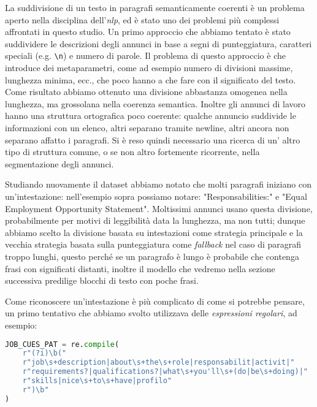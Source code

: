 \noindent La suddivisione di un testo in paragrafi semanticamente coerenti è un problema aperto nella disciplina dell'\textit{nlp}, ed è stato uno dei problemi più complessi affrontati in questo studio. Un primo approccio che abbiamo tentato è stato suddividere le descrizioni degli annunci in base a segni di punteggiatura, caratteri speciali (e.g. \texttt{\textbackslash n}) e numero di parole. Il problema di questo approccio è che introduce dei metaparametri, come ad esempio numero di divisioni massime, lunghezza minima, ecc., che poco hanno a che fare con il significato del testo. Come risultato abbiamo ottenuto una divisione abbastanza omogenea nella lunghezza, ma grossolana nella coerenza semantica. Inoltre gli annunci di lavoro hanno una struttura ortografica poco coerente: qualche annuncio suddivide le informazioni con un elenco, altri separano tramite newline, altri ancora non separano affatto i paragrafi. Si è reso quindi necessario una ricerca di un' altro tipo di struttura comune, o se non altro fortemente ricorrente, nella segmentazione degli annunci.

\medskip

\noindent Studiando nuovamente il dataset abbiamo notato che molti paragrafi iniziano con un'intestazione: nell'esempio sopra possiamo notare: "Responsabilities:" e "Equal Employment Opportunity Statement". Moltissimi annunci usano questa divisione, probabilmente  per motivi di leggibilità data la lunghezza, ma non tutti; dunque abbiamo scelto la divisione basata su intestazioni come strategia principale e la vecchia strategia basata sulla punteggiatura come \textit{fallback} nel caso di paragrafi troppo lunghi, questo perché se un paragrafo è lungo è probabile che contenga frasi con significati distanti, inoltre il modello che vedremo nella sezione successiva predilige blocchi di testo con poche frasi.

\medskip

\noindent Come riconoscere un'intestazione è più complicato di come si potrebbe pensare, un primo tentativo che abbiamo svolto utilizzava delle \textit{espressioni regolari}, ad esempio:

\begin{lstlisting}[language=python]
JOB_CUES_PAT = re.compile(
    r"(?i)\b("
    r"job\s+description|about\s+the\s+role|responsabilit|activit|"
    r"requirements?|qualifications?|what\s+you'll\s+(do|be\s+doing)|"
    r"skills|nice\s+to\s+have|profilo"
    r")\b"
)
\end{lstlisting}

